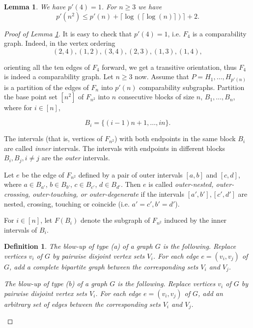 \documentclass[12pt]{article}
\newtheorem{lemma}[theorem]{Lemma}
\newtheorem{definition}{Definition}
\begin{document}
\begin{lemma}\label{rec}  We have $p'(4)=1$. For $n\ge 3$ we have
 $$p'(n^2)\le  p'(n)+ \lceil\log(\lceil\log(n)\rceil)\rceil + 2.$$
\end{lemma}

\begin{proof}[Proof of Lemma \ref{rec}]
It is easy to check that $p'(4)=1$, i.e. $F_4$ is a comparability graph.
Indeed, in the vertex ordering
$$(2,4),(1,2),(3,4),(2,3),(1,3),(1,4),$$

orienting all the ten edges of $F_4$ forward, we get a transitive orientation, thus $F_4$ is indeed a comparability graph.
Let $n\ge 3$ now.
Assume that
$P=H_1,\dots,H_{p'(n)}$ is a partition of the edges of $F_n$ into $p'(n)$
comparability subgraphs. Partition the base point set $[n^2]$ of $F_{n^2}$ into $n$ consecutive blocks of size
$n$,  $B_1,\dots,B_n$, where for $i\in [n]$,

$$B_i=\{(i-1)n+1,\dots,in\}.$$




The intervals (that is, vertices of
$F_{n^2}$)
with both endpoints in the same block $B_i$
are called {\em inner} intervals.
The intervals with endpoints in different blocks $B_i,B_j,
i\ne j$  are the {\em outer} intervals.

Let $e$ be the edge of $F_{n^2}$ defined by a pair of
outer intervals $[a, b]$ and $[c, d]$,
where $a\in B_{a'}$,  $b\in B_{b'}$,   $c\in B_{c'}$,   $d\in B_{d'}$.
Then $e$ is called {\em outer-nested, outer-crossing, outer-touching, or outer-degenerate}
if the intervals $[a',b'],[c',d']$ are nested, crossing, touching or coincide (i.e. $a'=c',b'=d'$).


For $i\in [n]$, let $F(B_i)$ denote the subgraph of $F_{n^2}$ induced by the inner intervals of $B_i$.

\begin{definition}
  The {\em blow-up of type (a)} of a graph $G$ is the following.
  Replace vertices  $v_i$ of $G$ by pairwise disjoint vertex sets $V_i$.
  For each edge $e=(v_i,v_j)$ of $G$, add a complete bipartite graph between
  the corresponding sets $V_i$ and $V_j$.

  The {\em blow-up of type (b)} of a graph $G$ is the following.
Replace vertices  $v_i$ of $G$ by pairwise disjoint vertex sets $V_i$.
  For each edge $e=(v_i,v_j)$ of $G$, add an arbitrary set of edges between
  the corresponding sets $V_i$ and $V_j$.
\end{definition}



\end{proof}
\end{document}

